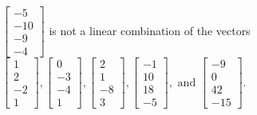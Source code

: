 \begin{exercise}
\begin{exerciseStatement}
  \end{exerciseStatement}
  \begin{exerciseAnswer}
   \(\left[\begin{array}{c}
-5 \\
-10 \\
-9 \\
-4
\end{array}\right]\) 
  	 is not  
	a linear combination of the vectors \(\left[\begin{array}{c}
1 \\
2 \\
-2 \\
1
\end{array}\right] , \left[\begin{array}{c}
0 \\
-3 \\
-4 \\
1
\end{array}\right] , \left[\begin{array}{c}
2 \\
1 \\
-8 \\
3
\end{array}\right] , \left[\begin{array}{c}
-1 \\
10 \\
18 \\
-5
\end{array}\right] , \text{ and } \left[\begin{array}{c}
-9 \\
0 \\
42 \\
-15
\end{array}\right]\).

	
  


  \end{exerciseAnswer}
\end{exercise}